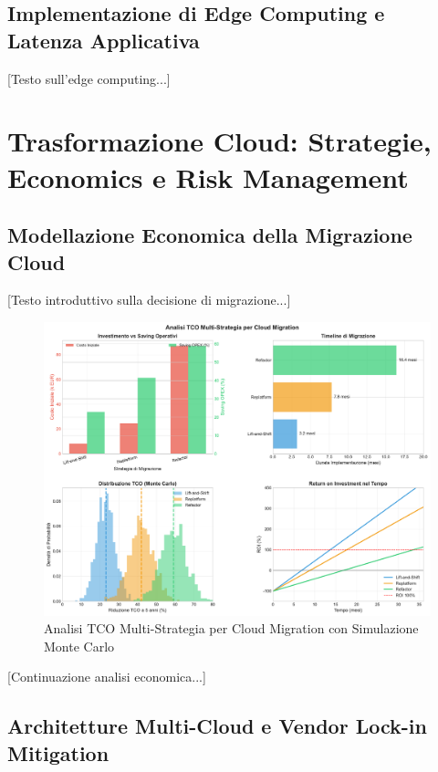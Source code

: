 \subsection{Implementazione di Edge Computing e Latenza Applicativa}

[Testo sull'edge computing...]

\section{Trasformazione Cloud: Strategie, Economics e Risk Management}

\subsection{Modellazione Economica della Migrazione Cloud}

[Testo introduttivo sulla decisione di migrazione...]

\begin{figure}[htbp]
\centering
\includegraphics[width=\textwidth]{figura_3_3_cloud_tco.pdf}
\caption{Analisi TCO Multi-Strategia per Cloud Migration con Simulazione Monte Carlo}
\label{fig:cloud_tco}
\end{figure}

[Continuazione analisi economica...]

\subsection{Architetture Multi-Cloud e Vendor Lock-in Mitigation}

